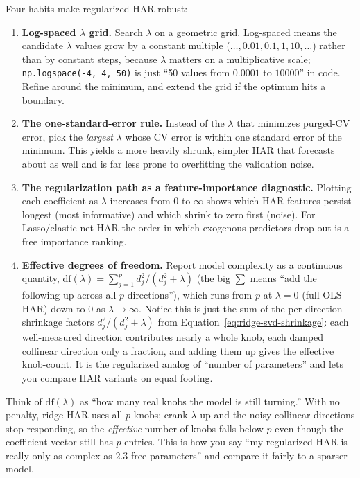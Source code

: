 \begin{keyidea}
Four habits make regularized HAR robust:
\begin{enumerate}[nosep]
  \item \textbf{Log-spaced $\lambda$ grid.} Search $\lambda$ on a geometric grid. Log-spaced means the candidate $\lambda$ values grow by a constant multiple ($\ldots, 0.01, 0.1, 1, 10, \ldots$) rather than by constant steps, because $\lambda$ matters on a multiplicative scale; \texttt{np.logspace(-4, 4, 50)} is just ``50 values from $0.0001$ to $10000$'' in code. Refine around the minimum, and extend the grid if the optimum hits a boundary.
  \item \textbf{The one-standard-error rule.} Instead of the $\lambda$ that minimizes purged-CV error, pick the \emph{largest} $\lambda$ whose CV error is within one standard error of the minimum. This yields a more heavily shrunk, simpler HAR that forecasts about as well and is far less prone to overfitting the validation noise.
  \item \textbf{The regularization path as a feature-importance diagnostic.} Plotting each coefficient as $\lambda$ increases from $0$ to $\infty$ shows which HAR features persist longest (most informative) and which shrink to zero first (noise). For Lasso/elastic-net-HAR the order in which exogenous predictors drop out is a free importance ranking.
  \item \textbf{Effective degrees of freedom.} Report model complexity as a continuous quantity, $\mathrm{df}(\lambda) = \sum_{j=1}^{p} d_j^2/(d_j^2 + \lambda)$ (the big $\sum$ means ``add the following up across all $p$ directions''), which runs from $p$ at $\lambda = 0$ (full OLS-HAR) down to $0$ as $\lambda \to \infty$. Notice this is just the sum of the per-direction shrinkage factors $d_j^2/(d_j^2+\lambda)$ from Equation~\eqref{eq:ridge-svd-shrinkage}: each well-measured direction contributes nearly a whole knob, each damped collinear direction only a fraction, and adding them up gives the effective knob-count. It is the regularized analog of ``number of parameters'' and lets you compare HAR variants on equal footing.
\end{enumerate}
\end{keyidea}

\begin{intuition}
Think of $\mathrm{df}(\lambda)$ as ``how many real knobs the model is still turning.''
With no penalty, ridge-HAR uses all $p$ knobs; crank $\lambda$ up and the noisy collinear directions stop responding, so the \emph{effective} number of knobs falls below $p$ even though the coefficient vector still has $p$ entries.
This is how you say ``my regularized HAR is really only as complex as $2.3$ free parameters'' and compare it fairly to a sparser model.
\end{intuition}

